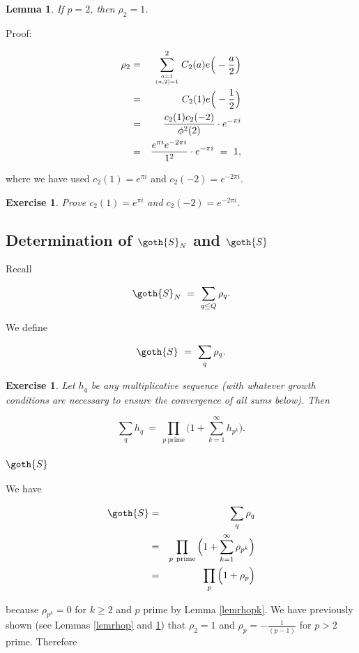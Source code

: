 \documentclass[12pt,letterpaper]{report}
\newcommand\be{\begin{equation}}
\newcommand\ee{\end{equation}}
\newcommand\bea{\begin{eqnarray}}
\newcommand\eea{\end{eqnarray}}
\newtheorem{lem}[thm]{Lemma}
\newtheorem{exe}[thm]{Exercise}
\begin{document}
\begin{lem}\label{lemrhotwo} If $p = 2$, then $\rho_2 = 1$. \end{lem}

Proof:

\bea \rho_2 &=& \sum_{a = 1\atop (a,2) = 1}^2 C_2(a)
e\Big(-\frac{a}{2} \Big) \nonumber\\ &=& C_2(1) e\Big(-
\frac{1}{2} \Big) \nonumber\\ &=& \frac{c_2(1) c_2(-2)}{\phi^2(2)}
\cdot e^{-\pi i} \nonumber\\ &=& \frac{e^{\pi i} e^{-2\pi i}}{1^2}
\cdot e^{-\pi i} \ = \ 1, \eea

where we have used $c_2(1) = e^{\pi i}$ and $c_2(-2) = e^{-2\pi
i}$.

\begin{exe} Prove  $c_2(1) = e^{\pi i}$ and $c_2(-2) = e^{-2\pi
i}$. \end{exe}


\subsection{Determination of $\goth{S}_N$ and $\goth{S}$}

Recall

\be \goth{S}_N \ = \ \sum_{q \le Q} \rho_q. \ee

We define

\be \goth{S} \ = \ \sum_q \rho_q. \ee

\begin{exe} Let $h_q$ be any multiplicative sequence (with
whatever growth conditions are necessary to ensure the convergence
of all sums below). Then

\be \sum_q h_q \ = \ \prod_{p \ \text{prime} } \Big( 1 +
\sum_{k=1}^\infty h_{p^k} \Big). \ee

\end{exe}

\subsubsection{$\goth{S}$}

We have

\bea \goth{S} &=& \sum_q \rho_q \nonumber\\ &=& \prod_{p \
\text{prime} } \Big( 1 + \sum_{k=1}^\infty \rho_{p^k} \Big)
\nonumber\\ &=& \prod_p \Big(1 + \rho_p\Big) \eea

because $\rho_{p^k} = 0$ for $k \ge 2$ and $p$ prime by Lemma
\ref{lemrhopk}. We have previously shown (see Lemmas \ref{lemrhop}
and \ref{lemrhotwo}) that $\rho_2 = 1$ and $\rho_p =
-\frac{1}{(p-1)}$ for $p > 2$ prime. Therefore
\end{document}
